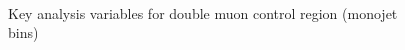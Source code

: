 \begin{figure}
\begin{center}
         \\
        \caption{Key analysis variables for double muon control region (monojet bins)}
        \label{fig:distribution_doublemu_mono}
    \end{center}
\end{figure}
